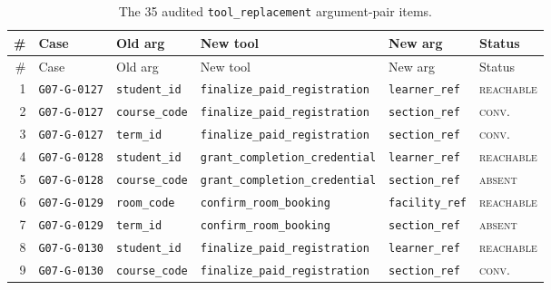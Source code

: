 \documentclass[11pt]{article}
\newcommand{\st}[1]{\textsc{\small #1}}
\newcommand{\dfam}[1]{\texttt{#1}}
\begin{document}
\begin{longtable}{@{}rlllll@{}}
\caption{The 35 audited \dfam{tool\_replacement} argument-pair items.}
\label{tab:register}\\
\toprule
\# & Case & Old arg & New tool & New arg & Status \\
\midrule
\endfirsthead
\toprule
\# & Case & Old arg & New tool & New arg & Status \\
\midrule
\endhead
\bottomrule
\endfoot
\footnotesize 1 & \texttt{\footnotesize G07-G-0127} & \texttt{\footnotesize student\_id} & \texttt{\footnotesize finalize\_paid\_registration} & \texttt{\footnotesize learner\_ref} & \st{reachable} \\
\footnotesize 2 & \texttt{\footnotesize G07-G-0127} & \texttt{\footnotesize course\_code} & \texttt{\footnotesize finalize\_paid\_registration} & \texttt{\footnotesize section\_ref} & \st{conv.} \\
\footnotesize 3 & \texttt{\footnotesize G07-G-0127} & \texttt{\footnotesize term\_id} & \texttt{\footnotesize finalize\_paid\_registration} & \texttt{\footnotesize section\_ref} & \st{conv.} \\
\footnotesize 4 & \texttt{\footnotesize G07-G-0128} & \texttt{\footnotesize student\_id} & \texttt{\footnotesize grant\_completion\_credential} & \texttt{\footnotesize learner\_ref} & \st{reachable} \\
\footnotesize 5 & \texttt{\footnotesize G07-G-0128} & \texttt{\footnotesize course\_code} & \texttt{\footnotesize grant\_completion\_credential} & \texttt{\footnotesize section\_ref} & \st{absent} \\
\footnotesize 6 & \texttt{\footnotesize G07-G-0129} & \texttt{\footnotesize room\_code} & \texttt{\footnotesize confirm\_room\_booking} & \texttt{\footnotesize facility\_ref} & \st{reachable} \\
\footnotesize 7 & \texttt{\footnotesize G07-G-0129} & \texttt{\footnotesize term\_id} & \texttt{\footnotesize confirm\_room\_booking} & \texttt{\footnotesize section\_ref} & \st{absent} \\
\footnotesize 8 & \texttt{\footnotesize G07-G-0130} & \texttt{\footnotesize student\_id} & \texttt{\footnotesize finalize\_paid\_registration} & \texttt{\footnotesize learner\_ref} & \st{reachable} \\
\footnotesize 9 & \texttt{\footnotesize G07-G-0130} & \texttt{\footnotesize course\_code} & \texttt{\footnotesize finalize\_paid\_registration} & \texttt{\footnotesize section\_ref} & \st{conv.} \\

\end{longtable}
\end{document}

